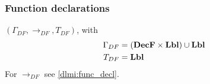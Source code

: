 \subsubsection{Function declarations}

$(\Gamma_{DF}, \rightarrow_{DF}, T_{DF})$, with
\begin{align*}
  \Gamma_{DF} & = (\mathbf{DecF} \times \mathbf{Lbl}) \cup \mathbf{Lbl} \\
  T_{DF} & = \mathbf{Lbl} \\
\end{align*}
For $\rightarrow_{DF}$ see \cref{dlmi:func_decl}.


